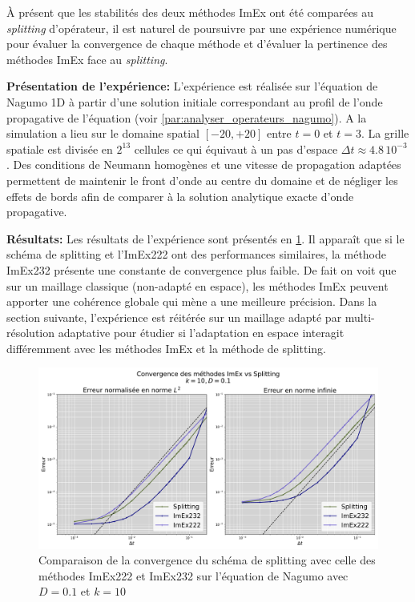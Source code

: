 À présent que les stabilités des deux méthodes ImEx ont été comparées au \textit{splitting} d'opérateur, 
il est naturel de poursuivre par une expérience numérique pour évaluer la convergence de chaque méthode et 
d'évaluer la pertinence des méthodes ImEx face au \textit{splitting}.\par
\textbf{Présentation de l'expérience: }
    L'expérience est réalisée sur l'équation de Nagumo 1D à partir d'une solution initiale correspondant au profil de l'onde propagative de l'équation (voir \ref{par:analyser_operateurs_nagumo}).
    A la simulation a lieu sur le domaine spatial $[-20,+20]$ entre $t=0$ et $t=3$.
    La grille spatiale est divisée en $2^{13}$ cellules ce qui équivaut à un pas d'espace $\Delta t \approx 4.8 \, 10^{-3}$.
    Des conditions de Neumann homogènes et une vitesse de propagation adaptées permettent de maintenir le front d'onde au centre du domaine et 
    de négliger les effets de bords afin de comparer à la solution analytique exacte d'onde propagative.\par
\textbf{Résultats: }
    Les résultats de l'expérience sont présentés en \ref{fig:imex_vs_splitting}. Il apparaît que si le schéma de splitting et l'ImEx222 ont des performances similaires, la méthode ImEx232
    présente une constante de convergence plus faible. De fait on voit que sur un maillage classique (non-adapté en espace), les méthodes ImEx peuvent apporter une cohérence globale qui mène a 
    une meilleure précision. Dans la section suivante, l'expérience est réitérée sur un maillage adapté par multi-résolution adaptative pour étudier si l'adaptation en espace 
    interagit différemment avec les méthodes ImEx et la méthode de splitting.
    \begin{figure}[hb!]
        \centering
        \includegraphics[width=\linewidth]{media/4_travail/2_nagumo/convergence/ImEx_vs_splitting_k10_D0.1.pdf}
    \caption{Comparaison de la convergence du schéma de splitting avec celle des méthodes ImEx222 et ImEx232
    sur l'équation de Nagumo avec $D=0.1$ et $k=10$}
    \label{fig:imex_vs_splitting}
    \end{figure}
\newpage
